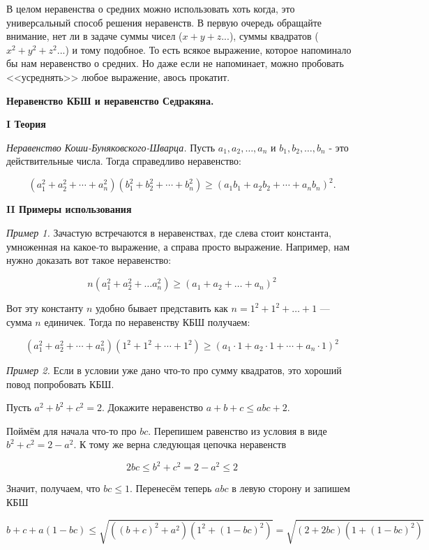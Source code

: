 В целом неравенства о средних можно использовать хоть когда, это универсальный способ решения неравенств. В первую очередь обращайте внимание, нет ли в задаче суммы чисел ($x+y+z...$), суммы квадратов ($x^2+y^2+z^2...$) и тому подобное. То есть всякое выражение, которое напоминало бы нам неравенство о средних. Но даже если не напоминает, можно пробовать <<усреднять>> любое выражение, авось прокатит.

\textbf{\Large Неравенство КБШ и неравенство Седракяна.}

\textbf{I Теория}

\textit{Неравенство Коши-Буняковского-Шварца.}
Пусть $a_1, a_2, \ldots, a_n$ и $b_1, b_2, \ldots, b_n$ - это действительные числа. Тогда справедливо неравенство:

$$
\left(a_1^2+a_2^2+\cdots+a_n^2\right)\left(b_1^2+b_2^2+\cdots+b_n^2\right) \geqslant\left(a_1 b_1+a_2 b_2+\cdots+a_n b_n\right)^2 .
$$

\textbf{II Примеры использования}

\textit{Пример 1.} 
Зачастую встречаются в неравенствах, где слева стоит константа, умноженная на какое-то выражение, а справа просто выражение. Например, нам нужно доказать вот такое неравенство:

$$
    n(a_1^2 + a_2^2 + \ldots a_n^2) \geqslant (a_1 + a_2 + \ldots + a_n)^2
$$

Вот эту константу $n$ удобно бывает представить как $n = 1^2 + 1^2 + \ldots + 1$ --- сумма $n$ единичек. Тогда по неравенству КБШ получаем:

$$
    \left(a_1^2+a_2^2+\cdots+a_n^2\right)\left(1^2+1^2+\cdots+1^2\right) \geqslant\left(a_1 \cdot 1+a_2 \cdot 1+\cdots+a_n \cdot 1\right)^2
$$

\textit{Пример 2.}
Если в условии уже дано что-то про сумму квадратов, это хороший повод попробовать КБШ.

Пусть $a^2+b^2+c^2=2$. Докажите неравенство $a+b+c \leqslant a b c+2$.

Поймём для начала что-то про $b c$. Перепишем равенство из условия в виде $b^2+c^2=2-a^2$. К тому же верна следующая цепочка неравенств

$$
2 b c \leqslant b^2+c^2=2-a^2 \leqslant 2
$$


Значит, получаем, что $b c \leqslant 1$. Перенесём теперь $a b c$ в левую сторону и запишем КБШ

$$
b+c+a(1-b c) \leqslant \sqrt{\left((b+c)^2+a^2\right)\left(1^2+(1-b c)^2\right)}=\sqrt{(2+2 b c)\left(1+(1-b c)^2\right)}
$$


